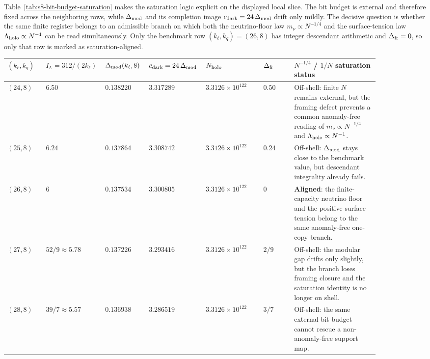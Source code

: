 \documentclass[11pt]{article}
\begin{document}
Table~\ref{tab:s8-bit-budget-saturation} makes the saturation logic explicit on
the displayed local slice. The bit budget is external and therefore fixed across
the neighboring rows, while $\Delta_{\rm mod}$ and its completion image
$c_{\rm dark}=24\,\Delta_{\rm mod}$ drift only mildly. The decisive question is
whether the same finite register belongs to an admissible branch on which both
the neutrino-floor law $m_{\nu}\propto N^{-1/4}$ and the surface-tension law
$\Lambda_{\rm holo}\propto N^{-1}$ can be read simultaneously. Only the
benchmark row $(k_{\ell},k_q)=(26,8)$ has integer descendant arithmetic and
$\Delta_{\rm fr}=0$, so only that row is marked as saturation-aligned.

\begin{table}[t]
\centering
\scriptsize
\setlength{\tabcolsep}{2pt}
\renewcommand{\arraystretch}{1.15}
\begin{tabular}{p{0.10\linewidth}p{0.11\linewidth}p{0.11\linewidth}p{0.11\linewidth}p{0.15\linewidth}p{0.08\linewidth}p{0.22\linewidth}}
\hline
$(k_{\ell},k_q)$ & $I_L=312/(2k_{\ell})$ & $\Delta_{\rm mod}(k_{\ell},8)$ & $c_{\rm dark}=24\,\Delta_{\rm mod}$ & $N_{\rm holo}$ & $\Delta_{\rm fr}$ & $N^{-1/4}$ / $1/N$ saturation status \\
\hline
$(24,8)$ & $6.50$ & $0.138220$ & $3.317289$ & $3.3126\times10^{122}$ & $0.50$ & Off-shell: finite $N$ remains external, but the framing defect prevents a common anomaly-free reading of $m_{\nu}\propto N^{-1/4}$ and $\Lambda_{\rm holo}\propto N^{-1}$. \\
$(25,8)$ & $6.24$ & $0.137864$ & $3.308742$ & $3.3126\times10^{122}$ & $0.24$ & Off-shell: $\Delta_{\rm mod}$ stays close to the benchmark value, but descendant integrality already fails. \\
$(26,8)$ & $6$ & $0.137534$ & $3.300805$ & $3.3126\times10^{122}$ & $0$ & \textbf{Aligned}: the finite-capacity neutrino floor and the positive surface tension belong to the same anomaly-free one-copy branch. \\
$(27,8)$ & $52/9\approx5.78$ & $0.137226$ & $3.293416$ & $3.3126\times10^{122}$ & $2/9$ & Off-shell: the modular gap drifts only slightly, but the branch loses framing closure and the saturation identity is no longer on shell. \\
$(28,8)$ & $39/7\approx5.57$ & $0.136938$ & $3.286519$ & $3.3126\times10^{122}$ & $3/7$ & Off-shell: the same external bit budget cannot rescue a non-anomaly-free support map. \\
\hline
\end{tabular}

\end{table}
\end{document}
